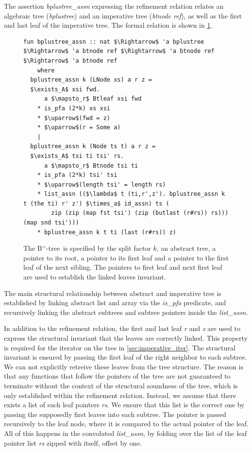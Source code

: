 \documentclass[a4paper,UKenglish,cleveref, cref, thm-restate]{lipics-v2021}
\newcommand{\btree}{B$^+$-tree}
\begin{document}
The assertion \emph{bplustree\_assn} expressing the refinement relation
 relates an algebraic tree (\emph{bplustree})
and an imperative tree (\emph{btnode ref}), as well as the first and last leaf of the imperative tree.
The formal relation is shown in \cref{fig:btree-assn}.

\begin{figure}
   \centering 
\begin{lstlisting}[mathescape=true, language=Isabelle,label=lst:btree-relation]
fun bplustree_assn :: nat $\Rightarrow$ 'a bplustree $\Rightarrow$ 'a btnode ref $\Rightarrow$ 'a btnode ref $\Rightarrow$ 'a btnode ref
    where
  bplustree_assn k (LNode xs) a r z =
  $\exists_A$ xsi fwd.
      a $\mapsto_r$ Btleaf xsi fwd
    * is_pfa (2*k) xs xsi
    * $\uparrow$(fwd = z)
    * $\uparrow$(r = Some a)
    |
  bplustree_assn k (Node ts t) a r z =
  $\exists_A$ tsi ti tsi' rs.
      a $\mapsto_r$ Btnode tsi ti
    * is_pfa (2*k) tsi' tsi
    * $\uparrow$(length tsi' = length rs)
    * list_assn (($\lambda$ t (ti,r',z'). bplustree_assn k t (the ti) r' z') $\times_a$ id_assn) ts (
        zip (zip (map fst tsi') (zip (butlast (r#rs)) rs))) (map snd tsi')))
    * bplustree_assn k t ti (last (r#rs)) z)
\end{lstlisting}
    \caption[Assertion describing the imperative \btree]{
        The \btree\ is specified by the split factor $k$, an abstract tree,
        a pointer to its root, a pointer to its first leaf and a pointer
        to the first leaf of the next sibling.
        The pointers to first leaf and next first leaf are used
        to establish the linked leaves invariant.
    }
    \label{fig:btree-assn}
\end{figure}

The main structural relationship between abstract and imperative tree
is established by linking abstract list and array via the \textit{is\_pfa} predicate,
and recursively linking the abstract subtrees and subtree pointers
inside the \textit{list\_assn}.

In addition to the refinement relation,
the first and last leaf \textit{r} and \textit{z} are used to express the structural invariant
that the leaves are correctly linked.
This property is required for the iterator on the tree in \cref{sec:imperative_iter}.
The structural invariant is ensured
by passing the first leaf of the right neighbor to each subtree.
We can not explicitly retreive these leaves from the tree structure.
The reason is that any functions that follow the pointers of the tree are not guaranteed
to terminate without the context of the structural soundness of the tree,
which is only established within the refinement relation.
Instead, we assume that there exists a list of such leaf pointers \textit{rs}.
We ensure that this list is the correct one by passing the supposedly
first leaves into each subtree.
The pointer is passed recursively to the leaf node,
where it is compared to the actual pointer of the leaf.
All of this happens in the convoluted \textit{list\_assn}, by
folding over the list of the leaf pointer list \textit{rs} zipped with itself, offset by one.
\end{document}
